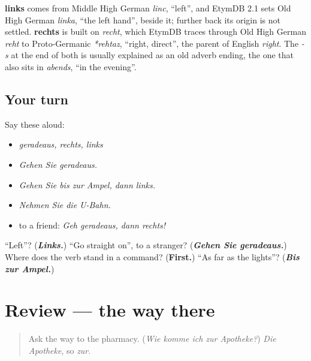 \begin{cousinweb}
\textbf{links} comes from Middle High German \emph{linc}, \textquotedblleft{}left\textquotedblright{}, and EtymDB 2.1 sets Old High German \emph{linka}, \textquotedblleft{}the left hand\textquotedblright{}, beside it; further back its origin is not settled. \textbf{rechts} is built on \emph{recht}, which EtymDB traces through Old High German \emph{reht} to Proto-Germanic \emph{*rehtaz}, \textquotedblleft{}right, direct\textquotedblright{}, the parent of English \emph{right}. The \emph{-s} at the end of both is usually explained as an old adverb ending, the one that also sits in \emph{abends}, \textquotedblleft{}in the evening\textquotedblright{}.
\end{cousinweb}

\subsection*{Your turn}
Say these aloud:

\begin{itemize}
\raggedright
  \item \emph{geradeaus, rechts, links}
  \item \emph{Gehen Sie geradeaus.}
  \item \emph{Gehen Sie bis zur Ampel, dann links.}
  \item \emph{Nehmen Sie die U-Bahn.}
  \item to a friend: \emph{Geh geradeaus, dann rechts!}
\end{itemize}

\begin{tcolorbox}[breakable,colback=teal!4,colframe=teal!35!black,title={Before you move on}]
\textquotedblleft{}Left\textquotedblright{}? (\emph{\textbf{Links.}}) \textquotedblleft{}Go straight on\textquotedblright{}, to a stranger? (\emph{\textbf{Gehen Sie geradeaus.}}) Where does the verb stand in a command? (\textbf{First.}) \textquotedblleft{}As far as the lights\textquotedblright{}? (\emph{\textbf{Bis zur Ampel.}})
\end{tcolorbox}
\section[(review)]{Review — the way there}

\label{lesson:GE-C256-review}



\begin{quote}
Ask the way to the pharmacy. (\emph{Wie komme ich zur Apotheke?}) \emph{Die Apotheke}, so \emph{zur}.
\end{quote}

